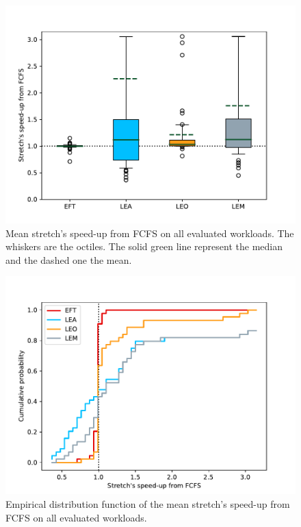 \documentclass[conference,10pt]{IEEEtran}
\begin{document}
\begin{figure}\centering\includegraphics[scale=0.41]{../MBSS/plot/Boxplot/box_plot_mean_stretch_all_workloads.pdf}\caption{Mean stretch's speed-up from FCFS on all evaluated workloads. The whiskers are the octiles. The solid green line represent the median and the dashed one the mean.}\label{boxplot.all}\end{figure}
\begin{figure}\centering\includegraphics[scale=0.41]{../MBSS/plot/ECDF/ecdf_mean_stretch_all_workloads.pdf}\caption{Empirical distribution function of the mean stretch's speed-up from FCFS on all evaluated workloads.}\label{ecdf}\end{figure}
\end{document}
